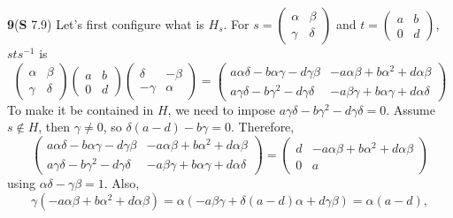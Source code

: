 \documentclass[a4paper, 12pt]{article}
\theoremstyle{Mydefinition}
\theoremstyle{Mytheorem}
\begin{document}
\noindent \textbf{9}(\textbf{S} 7.9)
    Let's first configure what is $H_s$. For $s = \begin{pmatrix}\alpha & \beta\\ \gamma & \delta
    \end{pmatrix}$ and $t = \begin{pmatrix}
    a & b\\ 0 & d
    \end{pmatrix}$, $sts^{-1}$ is
\begin{equation}
    \begin{pmatrix}
    \alpha & \beta\\
    \gamma & \delta
    \end{pmatrix}\begin{pmatrix}
    a & b \\ 0 & d
    \end{pmatrix}\begin{pmatrix}
    \delta & -\beta\\
    -\gamma & \alpha
    \end{pmatrix} = \begin{pmatrix}
    a\alpha\delta - b\alpha\gamma - d\gamma\beta & -a\alpha\beta + b\alpha^2+d\alpha\beta\\
    a\gamma\delta - b\gamma^2 - d\gamma\delta & -a\beta\gamma + b\alpha\gamma + d\alpha\delta
    \end{pmatrix}
\end{equation}
To make it be contained in $H$, we need to impose $a\gamma\delta - b\gamma^2 - d\gamma\delta = 0$. Assume $s\not\in H$, then $\gamma\neq 0$, so $\delta(a-d)-b\gamma = 0$. Therefore,
\begin{equation}
    \begin{pmatrix}
    a\alpha\delta - b\alpha\gamma - d\gamma\beta & -a\alpha\beta + b\alpha^2+d\alpha\beta\\
    a\gamma\delta - b\gamma^2 - d\gamma\delta & -a\beta\gamma + b\alpha\gamma + d\alpha\delta
    \end{pmatrix} = \begin{pmatrix}
    d & -a\alpha\beta + b\alpha^2+d\alpha\beta\\
    0 & a
    \end{pmatrix}
\end{equation}
using $\alpha\delta-\gamma\beta = 1$. Also,
\begin{equation}
    \gamma(-a\alpha\beta + b\alpha^2+d\alpha\beta) = \alpha(-a\beta\gamma + \delta(a-d)\alpha + d\gamma\beta) = \alpha(a-d),
\end{equation}
\end{document}
